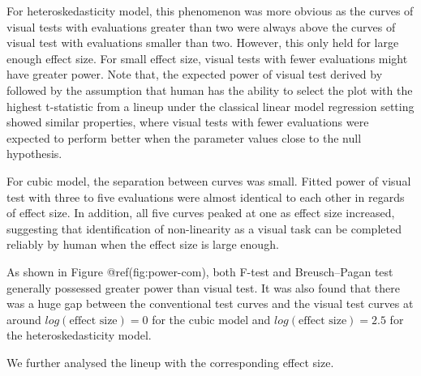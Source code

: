 \documentclass[]{interact}
\theoremstyle{plain}%
\theoremstyle{definition}
\theoremstyle{remark}
\begin{document}
For heteroskedasticity model, this phenomenon was more obvious as the
curves of visual tests with evaluations greater than two were always
above the curves of visual test with evaluations smaller than two.
However, this only held for large enough effect size. For small effect
size, visual tests with fewer evaluations might have greater power. Note
that, the expected power of visual test derived by
\citet{majumder_validation_2013} followed by the assumption that human
has the ability to select the plot with the highest t-statistic from a
lineup under the classical linear model regression setting showed
similar properties, where visual tests with fewer evaluations were
expected to perform better when the parameter values close to the null
hypothesis.

For cubic model, the separation between curves was small. Fitted power
of visual test with three to five evaluations were almost identical to
each other in regards of effect size. In addition, all five curves
peaked at one as effect size increased, suggesting that identification
of non-linearity as a visual task can be completed reliably by human
when the effect size is large enough.

As shown in Figure @ref(fig:power-com), both F-test and Breusch--Pagan
test generally possessed greater power than visual test. It was also
found that there was a huge gap between the conventional test curves and
the visual test curves at around \(log(\text{effect size}) = 0\) for the
cubic model and \(log(\text{effect size}) = 2.5\) for the
heteroskedasticity model.

We further analysed the lineup with the corresponding effect size.
\end{document}

